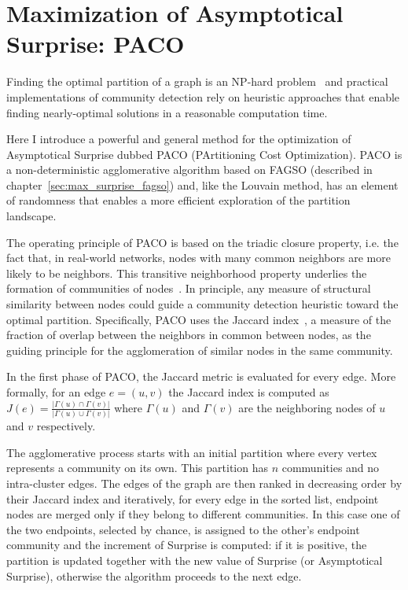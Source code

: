 \section{Maximization of Asymptotical Surprise: PACO}
Finding the optimal partition of a graph is an NP-hard problem~\cite{fortunato2010} and practical implementations of community detection rely on heuristic approaches that enable finding nearly-optimal solutions in a reasonable computation time.

Here I introduce a powerful and general method for the optimization of Asymptotical Surprise dubbed PACO (PArtitioning Cost Optimization).
PACO is a non-deterministic agglomerative algorithm based on FAGSO (described in chapter~\ref{sec:max_surprise_fagso}) and, like the Louvain method, has an element of randomness that enables a more efficient exploration of the partition landscape.

The operating principle of PACO is based on the triadic closure property, i.e.
the fact that, in real-world networks, nodes with many common neighbors are more likely to be neighbors.
This transitive neighborhood property underlies the formation of communities of nodes~\cite{bianconi2014,eustace2015}.
In principle, any measure of structural similarity between nodes could guide a community detection heuristic toward the optimal partition.
Specifically, PACO uses the Jaccard index~\cite{jaccard1901}, a measure of the fraction of overlap between the neighbors in common between nodes, as the guiding principle for the agglomeration of similar nodes in the same community.

In the first phase of PACO, the Jaccard metric is evaluated for every edge.
More formally, for an edge $e=(u,v)$ the Jaccard index is computed as $J(e)=\frac{|\Gamma(u) \cap \Gamma(v)|}{|\Gamma(u) \cup \Gamma(v)|}$ where $\Gamma(u)$ and $\Gamma(v)$ are the neighboring nodes of $u$ and $v$ respectively.

The agglomerative process starts with an initial partition where every vertex represents a community on its own.
This partition has $n$ communities and no intra-cluster edges.
The edges of the graph are then ranked in decreasing order by their Jaccard index and iteratively, for every edge in the sorted list, endpoint nodes are merged only if they belong to different communities.
In this case one of the two endpoints, selected by chance, is assigned to the other's endpoint community and the increment of Surprise is computed: if it is positive, the partition is updated together with the new value of Surprise (or Asymptotical Surprise), otherwise the algorithm proceeds to the next edge.


